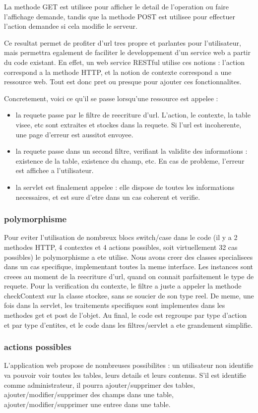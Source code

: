 La methode GET est utilisee pour afficher le detail de l'operation ou faire l'affichage demande, tandis que la methode POST est utilisee pour effectuer l'action demandee si cela modifie le serveur.

Ce resultat permet de profiter d'url tres propre et parlantes pour l'utilisateur, mais permettra egalement de faciliter le developpement d'un service web a partir du code existant. En effet, un web service RESTful utilise ces notions : l'action correspond a la methode HTTP, et la notion de contexte correspond a une ressource web. Tout est donc pret ou presque pour ajouter ces fonctionnalites.

Concretement, voici ce qu'il se passe lorsqu'une ressource est appelee :
\begin{itemize}
	\item la requete passe par le filtre de reecriture d'url. L'action, le contexte, la table visee, etc sont extraites et stockes dans la requete. Si l'url est incoherente, une page d'erreur est aussitot envoyee.
	\item la requete passe dans un second filtre, verifiant la validite des informations : existence de la table, existence du champ, etc. En cas de probleme, l'erreur est affichee a l'utilisateur.
	\item la servlet est finalement appelee : elle dispose de toutes les informations necessaires, et est sure d'etre dans un cas coherent et verifie.
\end{itemize}

\subsubsection{polymorphisme}
Pour eviter l'utilisation de nombreux blocs switch/case dans le code (il y a 2 methodes HTTP, 4 contextes et 4 actions possibles, soit virtuellement 32 cas possibles) le polymorphisme a ete utilise. Nous avons creer des classes specialisees dans un cas specifique, implementant toutes la meme interface. Les instances sont creees au moment de la reecriture d'url, quand on connait parfaitement le type de requete. Pour la verification du contexte, le filtre a juste a appeler la methode checkContext sur la classe stockee, sans se soucier de son type reel. De meme, une fois dans la servlet, les traitements specifiques sont implementes dans les methodes get et post de l'objet. Au final, le code est regroupe par type d'action et par type d'entites, et le code dans les filtres/servlet a ete grandement simplifie.

\subsubsection{actions possibles}
L'application web propose de nombreuses possibilites : un utilisateur non identifie va pouvoir voir toutes les tables, leurs details et leurs contenus.
S'il est identifie comme administrateur, il pourra ajouter/supprimer des tables, ajouter/modifier/supprimer des champs dans une table, ajouter/modifier/supprimer une entree dans une table.

